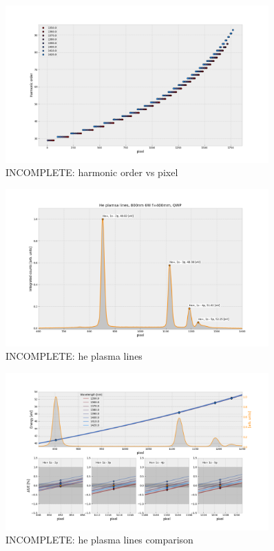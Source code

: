 \begin{figure}
	\centering
	\includegraphics[width=0.9\textwidth]{figures/Beamline/harmonic order vs pixel.png}
	\caption{INCOMPLETE: harmonic order vs pixel}
	\label{fig:harm_order_vs_pixel}
\end{figure}

\begin{figure}
	\centering
	\includegraphics[width=0.9\textwidth]{figures/Beamline/He_plasma_line_spectrum.png}
	\caption{INCOMPLETE: he plasma lines}
	\label{fig:He_plasma_lines}
\end{figure}

\begin{figure}
	\centering
	\includegraphics[width=0.9\textwidth]{figures/Beamline/He_plamsa_line_comparison.png}
	\caption{INCOMPLETE: he plasma lines comparison}
	\label{fig:plamsa_line_comparison}
\end{figure}

